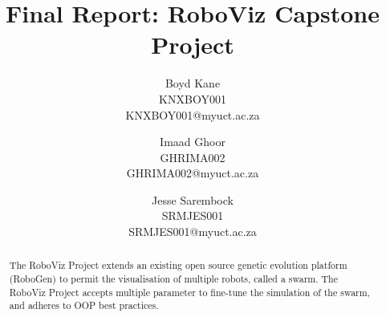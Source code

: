 \documentclass[11pt,a4paper]{article}
\begin{document}
\title{Final Report: RoboViz Capstone Project} \date{}
\author{Boyd Kane\\KNXBOY001\\KNXBOY001@myuct.ac.za
\and Imaad Ghoor\\GHRIMA002\\GHRIMA002@myuct.ac.za
\and Jesse Sarembock\\SRMJES001\\SRMJES001@myuct.ac.za}

\chead{}
\lfoot{}
\cfoot{\thepage}
\rfoot{}
\renewcommand{\headrulewidth}{0.0pt}

\maketitle
\thispagestyle{plain}

\begin{abstract}
    The RoboViz Project extends an existing open source genetic evolution
    platform (RoboGen) to permit the visualisation of multiple robots, called a
    swarm. The RoboViz Project accepts multiple parameter to fine-tune the
    simulation of the swarm, and adheres to OOP best practices.
\end{abstract}

%
%
%
%
%
\end{document}
